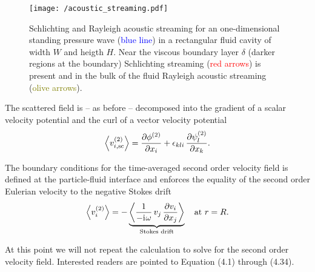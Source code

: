 \begin{figure}[tbp]
  \centering
  \texttt{[image: /acoustic\_streaming.pdf]}
  \caption{Schlichting and Rayleigh acoustic streaming for an one-dimensional 
    standing pressure wave (\textcolor{blue}{blue line}) in a rectangular fluid 
    cavity of width $W$ and heigth $H$. Near the viscous boundary layer 
    $\delta$ (darker regions at the boundary) Schlichting streaming 
    (\textcolor{red}{red arrows}) is present and in the bulk of the fluid 
  Rayleigh acoustic streaming (\textcolor{olive}{olive arrows}).}
  \label{fig:TA-acoustic_streaming}
\end{figure}

The scattered field is -- as before -- decomposed into the gradient of a scalar 
velocity potential and the curl of a vector velocity potential
\begin{equation}
  \left\langle v_{i,\mathrm{sc}}^{(2)} \right\rangle =
  \pdv{  \phi^{(2)}  }{x_{i}} + 
  \epsilon_{kli}\,\pdv{  \psi^{(2)}  _{l}}{x_{k}}.
  \label{eq:TA-nd-sc-decomposition}
\end{equation}

The boundary conditions for the time-averaged second order velocity field is 
defined at the particle-fluid interface and enforces the equality of the second 
order Eulerian velocity to the negative Stokes drift
\begin{equation}
  \left\langle v_{i}^{(2)} \right\rangle
  =
  -
  \underbrace{
    \left\langle \frac{1}{-\mathrm{i}\mkern1mu\omega}\,v_{j}\,\pdv{v_{i}}{x_{j}} \right\rangle
  }_{\text{Stokes drift}}
  \quad\text{at~}r=R.
  \label{eq:TA-nd-BCs}
\end{equation}


At this point we will not repeat the calculation to solve for the second order 
velocity field. Interested readers are pointed to  
Equation (4.1) through (4.34).


